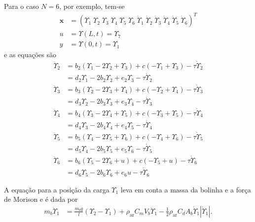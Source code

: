  Para o caso $N=6$, por exemplo, tem-se \begin{align}
\mathbf{x} &= \left(\Upsilon_1\;\Upsilon_2\;\Upsilon_3\;\Upsilon_4\;\Upsilon_5\;\Upsilon_6\;\dot{\Upsilon}_1\;\dot{\Upsilon}_2\;\dot{\Upsilon}_3\;\dot{\Upsilon}_4\;\dot{\Upsilon}_5\;\dot{\Upsilon}_6\right)^T 	\\
u &= \Upsilon(L,t) = \Upsilon_7\label{ufor6}\\
y &= \Upsilon(0,t) = \Upsilon_1\label{yfor6}
 \end{align} e as equações são \begin{align}
 	\ddot{\Upsilon}_2 &=  b_2\left(\Upsilon_{1}-2\Upsilon_{2} + \Upsilon_{3}\right)+c(-\Upsilon_1 + \Upsilon_3)-\tau \dot{\Upsilon}_2\nonumber \\
 	&= d_2\Upsilon_1 - 2b_2 \Upsilon_2 + e_2\Upsilon_3 - \tau \dot{\Upsilon}_2 \label{upsilon2}\\
 	\ddot{\Upsilon}_3 &=  b_3\left(\Upsilon_{2}-2\Upsilon_{3} + \Upsilon_{4}\right)+c(-\Upsilon_2 + \Upsilon_4)-\tau \dot{\Upsilon}_3\nonumber \\
 	&= d_3\Upsilon_2 - 2b_3 \Upsilon_3 + e_3\Upsilon_4 - \tau \dot{\Upsilon}_3\\
 	\ddot{\Upsilon}_4 &=  b_4\left(\Upsilon_{3}-2\Upsilon_{4} + \Upsilon_{5}\right)+c(-\Upsilon_3 + \Upsilon_5)-\tau \dot{\Upsilon}_4 \nonumber\\
 	&= d_4\Upsilon_3 - 2b_4 \Upsilon_4 + e_4\Upsilon_5 - \tau \dot{\Upsilon}_4\\
 	\ddot{\Upsilon}_5 &=  b_5\left(\Upsilon_{4}-2\Upsilon_{5} + \Upsilon_{6}\right)+c(-\Upsilon_4 + \Upsilon_6)-\tau \dot{\Upsilon}_5\nonumber\\
 	&= d_5\Upsilon_4 - 2b_5 \Upsilon_5 + e_5\Upsilon_6 - \tau \dot{\Upsilon}_5\\
 	\ddot{\Upsilon}_6 &=  b_6\left(\Upsilon_{5}-2\Upsilon_{6} + u\right)+c(-\Upsilon_5 + u)-\tau \dot{\Upsilon}_6\nonumber\\
 	&= d_6\Upsilon_5 - 2b_6 \Upsilon_6 + e_6 u - \tau \dot{\Upsilon}_6 \label{upsilon6}
 \end{align}

 A equação para a posição da carga $\Upsilon_1$ leva em conta a massa da bolinha e a força de Morison e é dada por \begin{align}
 	m_b \ddot{\Upsilon}_1 &= \frac{m_b g}{l}\left(\Upsilon_2 - \Upsilon_1\right) + \rho_{\mathrm{ar}} C_m V_b \ddot{\Upsilon}_1 - \frac{1}{2}\rho_{\textrm{ar}} C_d A_b \dot{\Upsilon}_1 \left|\dot{\Upsilon}_1\right|.\label{upsilon1previa}
 \end{align} 
 
